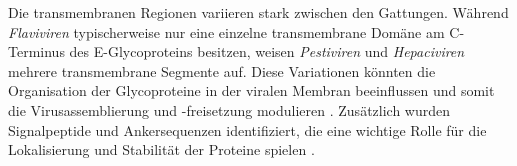 Die transmembranen Regionen variieren stark zwischen den Gattungen. Während \textit{Flaviviren} typischerweise nur eine einzelne transmembrane Domäne am C-Terminus des E-Glycoproteins besitzen, weisen \textit{Pestiviren} und \textit{Hepaciviren} mehrere transmembrane Segmente auf. Diese Variationen könnten die Organisation der Glycoproteine in der viralen Membran beeinflussen und somit die Virusassemblierung und -freisetzung modulieren \autocite{peninStructureFunctionMembrane2004}. Zusätzlich wurden Signalpeptide und Ankersequenzen identifiziert, die eine wichtige Rolle für die Lokalisierung und Stabilität der Proteine spielen \autocite{Ashkenazy2016}.